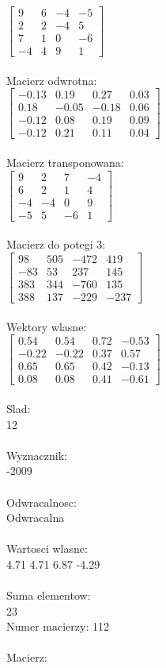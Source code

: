 \documentclass[a4paper,12pt]{article}
\begin{document}
$\begin{bmatrix} 9&6&-4&-5\\2&2&-4&5\\7&1&0&-6\\-4&4&9&1 \end{bmatrix}$
\\
\\
Macierz odwrotna:\\

$\begin{bmatrix} -0.13&0.19&0.27&0.03\\0.18&-0.05&-0.18&0.06\\-0.12&0.08&0.19&0.09\\-0.12&0.21&0.11&0.04 \end{bmatrix}$
\\
\\
Macierz transponowana:\\

$\begin{bmatrix} 9&2&7&-4\\6&2&1&4\\-4&-4&0&9\\-5&5&-6&1 \end{bmatrix}$
\\
\\
Macierz do potegi 3:\\

$\begin{bmatrix} 98&505&-472&419\\-83&53&237&145\\383&344&-760&135\\388&137&-229&-237 \end{bmatrix}$
\\
\\
Wektory wlasne:\\

$\begin{bmatrix} 0.54&0.54&0.72&-0.53\\-0.22&-0.22&0.37&0.57\\0.65&0.65&0.42&-0.13\\0.08&0.08&0.41&-0.61 \end{bmatrix}$
\\
\\
Slad:\\
12
\\
\\
Wyznacznik:\\
-2009
\\
\\
Odwracalnosc:\\
Odwracalna
\\
\\
Wartosci wlasne:\\
4.71 4.71 6.87 -4.29
\\
\\
Suma elementow:\\
23
\\
\newpage
Numer macierzy:
112
\\
\\
Macierz:\\
\end{document}
